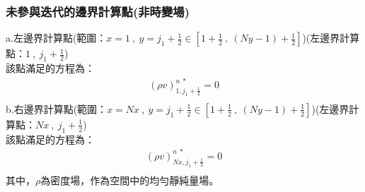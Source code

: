 \documentclass[12pt]{article}
\begin{document}
\subsubsection{未參與迭代的邊界計算點(非時變場)}
\noindent a.左邊界計算點(範圍：$x = 1 \ ,\ y = j_{1}+\frac{1}{2} \in [1+\frac{1}{2}\ ,\ (Ny-1)+\frac{1}{2}]$)(左邊界計算點：$1\ ,\ j_{1}+\frac{1}{2}$)\\[1.5ex]
\noindent 該點滿足的方程為：
\begin{equation}\begin{split}
   (\rho v)_{1,j_{1}+\frac{1}{2}}^{n\ *} = 0\\[1.5ex]
\end{split}\end{equation}
\noindent b.右邊界計算點(範圍：$x = Nx \ ,\ y = j_{1}+\frac{1}{2} \in [1+\frac{1}{2}\ ,\ (Ny-1)+\frac{1}{2}]$)(左邊界計算點：$Nx\ ,\ j_{1}+\frac{1}{2}$)\\[1.5ex]
\noindent 該點滿足的方程為：
\begin{equation}\begin{split}
   (\rho v)_{Nx,j_{1}+\frac{1}{2}}^{n\ *} = 0\\[1.5ex]
\end{split}\end{equation}
\noindent 其中，$\rho$為密度場，作為空間中的均勻靜純量場。
\end{document}
